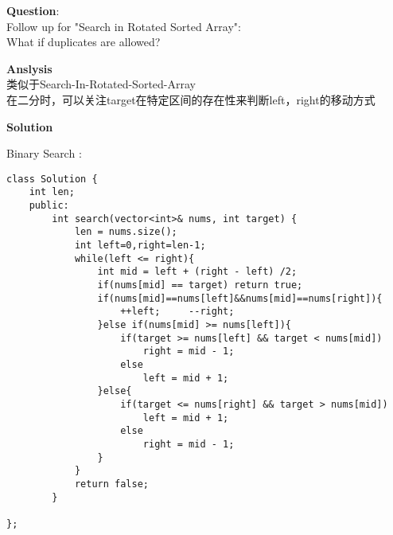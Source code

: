 \begin{description}
    \item{\textbf{Question}}:\\%
		Follow up for "Search in Rotated Sorted Array":\\
		What if duplicates are allowed?\\

    \item{\textbf{Anslysis}}\\
		类似于Search-In-Rotated-Sorted-Array\\
		在二分时，可以关注target在特定区间的存在性来判断left，right的移动方式\\
    \item{\textbf{Solution}}\\
	\item{Binary Search} : \\
		\begin{lstlisting}
class Solution {
	int len;
	public:
		int search(vector<int>& nums, int target) {
			len = nums.size();
			int left=0,right=len-1;
			while(left <= right){
				int mid = left + (right - left) /2;
				if(nums[mid] == target)	return true;
				if(nums[mid]==nums[left]&&nums[mid]==nums[right]){
					++left;		--right;
				}else if(nums[mid] >= nums[left]){
					if(target >= nums[left] && target < nums[mid])
						right = mid - 1;
					else 
						left = mid + 1;
				}else{
					if(target <= nums[right] && target > nums[mid])
						left = mid + 1;
					else 
						right = mid - 1;
				}
			}
			return false;
		}

};
		\end{lstlisting}
\end{description}

